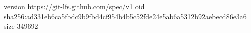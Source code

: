version https://git-lfs.github.com/spec/v1
oid sha256:ad331eb6ca5fbdc9b9fbd4cf954b4b5c52fde24e5ab6a5312b92aebecd86e3a6
size 349692
